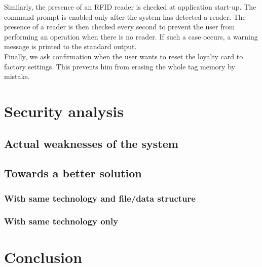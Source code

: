 \documentclass[a4paper,11pt,oneside]{article}
\begin{document}
Similarly, the presence of an RFID reader is checked at application start-up. The command prompt is enabled only after the system has detected a reader. The presence of a reader is then checked every second to prevent the user from performing an operation when there is no reader. If such a case occurs, a warning message is printed to the standard output. \\ 

Finally, we ask confirmation when the user wants to reset the loyalty card to factory settings. This prevents him from erasing the whole tag memory by mistake. \\ 



\section{Security analysis}

\subsection{Actual weaknesses of the system}

\subsection{Towards a better solution}

\subsubsection{With same technology and file/data structure}

\subsubsection{With same technology only}

\section{Conclusion}
\end{document}
